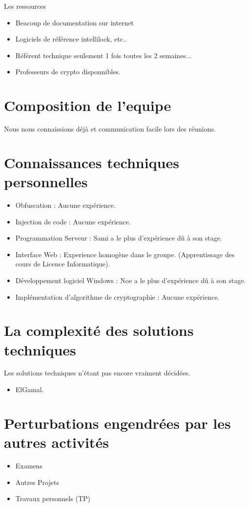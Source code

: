 Les ressources
\begin{itemize}
	\item Beacoup de documentation sur internet
	\item Logiciels de référence intellilock, etc..
	\item Référent technique seulement 1 fois toutes les 2 semaines...
	\item Professeurs de crypto disponnibles.\newline
\end{itemize}

\section{Composition de l'equipe}
Nous nous connaissions déjà et communication facile lors des réunions.

\section{Connaissances techniques personnelles}
\begin{itemize}
	\item Obfuscation : Aucune expérience.
	\item Injection de code : Aucune expérience.
	\item Programmation Serveur : Sami a le plus d'expérience dû à son stage.
	\item Interface Web : Experience homogène dans le groupe. (Apprentissage des cours de Licence Informatique).
	\item Développement logiciel Windows : Noe a le plus d'expérience dû à son stage.
	\item Implémentation d'algorithme de cryptographie : Aucune expérience. 
\end{itemize}

\section{La complexité des solutions techniques}
Les solutions techniques n'étant pas encore vraiment décidées.
\begin{itemize}
	\item ElGamal.
\end{itemize}

\section{Perturbations engendrées par les autres activités}
\begin{itemize}
	\item Examens
	\item Autres Projets
	\item Travaux personnels (TP)
\end{itemize}

